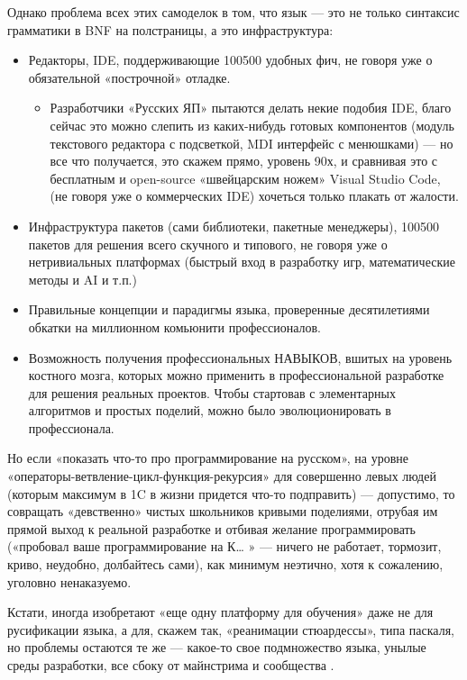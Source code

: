 ﻿\documentclass[a4paper,12pt]{article}
\providecommand{\tightlist}{%
     \setlength{\itemsep}{0pt}\setlength{\parskip}{0pt}}
\begin{document}
Однако проблема всех этих самоделок в том, что язык --- это не только
синтаксис грамматики в BNF на полстраницы, а это инфраструктура:

\begin{itemize}
\tightlist
\item
  Редакторы, IDE, поддерживающие 100500 удобных фич, не говоря уже о
  обязательной «построчной» отладке.

  \begin{itemize}
  \tightlist
  \item
    Разработчики «Русских ЯП» пытаются делать некие подобия IDE, благо
    сейчас это можно слепить из каких-нибудь готовых компонентов (модуль
    текстового редактора с подсветкой, MDI интерфейс с менюшками) --- но
    все что получается, это скажем прямо, уровень 90х, и сравнивая это с
    бесплатным и open-source «швейцарским ножем» Visual Studio Code, (не
    говоря уже о коммерческих IDE) хочеться только плакать от жалости.
  \end{itemize}
\item
  Инфраструктура пакетов (сами библиотеки, пакетные менеджеры), 100500
  пакетов для решения всего скучного и типового, не говоря уже о
  нетривиальных платформах (быстрый вход в разработку игр,
  математические методы и AI и т.п.)
\item
  Правильные концепции и парадигмы языка, проверенные десятилетиями
  обкатки на миллионном комьюнити профессионалов.
\item
  Возможность получения профессиональных НАВЫКОВ, вшитых на уровень
  костного мозга, которых можно применить в профессиональной разработке
  для решения реальных проектов. Чтобы стартовав с элементарных
  алгоритмов и простых поделий, можно было эволюционировать в
  профессионала.
\end{itemize}

Но если «показать что-то про программирование на русском», на уровне
«операторы-ветвление-цикл-функция-рекурсия» для совершенно левых людей
(которым максимум в 1C в жизни придется что-то подправить) ---
допустимо, то совращать «девственно» чистых школьников кривыми
поделиями, отрубая им прямой выход к реальной разработке и отбивая
желание программировать («пробовал ваше программирование на К\ldots{} »
--- ничего не работает, тормозит, криво, неудобно, долбайтесь сами), как
минимум неэтично, хотя к сожалению, уголовно ненаказуемо.

Кстати, иногда изобретают «еще одну платформу для обучения» даже не для
русификации языка, а для, скажем так, «реанимации стюардессы», типа
паскаля, но проблемы остаются те
же --- какое-то свое подмножество языка, унылые среды разработки, все
сбоку от майнстрима и сообщества \cite{pascal-sucks}.
\end{document}
